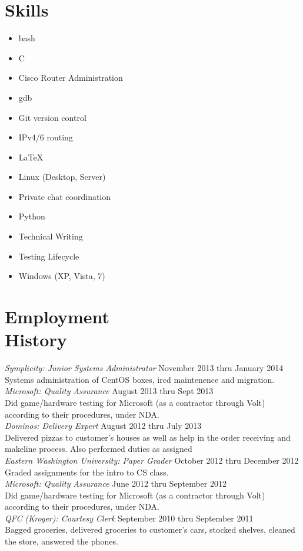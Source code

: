 \documentclass[line, margin]{res}
\begin{document}
\begin{resume}
\section{Skills}
\begin{multicols}{3}
  \begin{itemize}
    \item bash
    \item C
    \item Cisco Router Administration
    \item gdb
    \item Git version control
    \item IPv4/6 routing
    \item \LaTeX
    \item Linux (Desktop, Server)
    \item Private chat coordination
    \item Python
    \item Technical Writing
    \item Testing Lifecycle
    \item Windows (XP, Vista, 7)
  \end{itemize}
\end{multicols}

\section{Employment\\History}
 \textit{Symplicity: Junior Systems Administrator} \hfill November 2013 thru January 2014 \\
 Systems administration of CentOS boxes, ircd maintenence and migration.
 \textit{Microsoft: Quality Assurance} \hfill August 2013 thru Sept 2013 \\
 Did game/hardware testing for Microsoft (as a contractor through Volt) according to their procedures, under NDA. \\ [6pt]
 \textit{Dominos: Delivery Expert} \hfill August 2012 thru July 2013 \\
 Delivered pizzas to customer's houses as well as help in the order
 receiving and makeline process. Also performed duties as assigned \\ [6pt]
 \textit{Eastern Washington University: Paper Grader} \hfill October 2012 thru December 2012 \\
 Graded assignments for the intro to CS class. \\ [6pt]
 \textit{Microsoft: Quality Assurance} \hfill June 2012 thru September 2012 \\
 Did game/hardware testing for Microsoft (as a contractor through Volt) according to their procedures, under NDA. \\ [6pt]
 \textit{QFC (Kroger): Courtesy Clerk} \hfill September 2010 thru September 2011 \\
 Bagged groceries, delivered groceries to customer's cars, stocked
 shelves, cleaned the store, answered the phones. \\ 

\end{resume}
\end{document}
